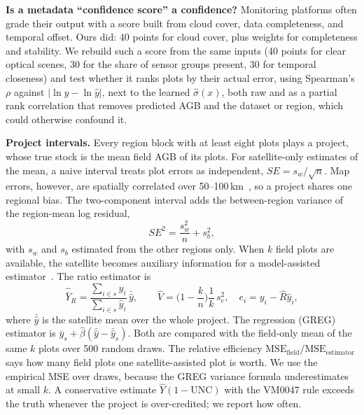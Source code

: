\documentclass[conference,a4paper]{IEEEtran}
\begin{document}
\textbf{Is a metadata ``confidence score'' a confidence?} Monitoring platforms often grade their output with a score built from cloud cover, data completeness, and temporal offset. Ours did: 40 points for cloud cover, plus weights for completeness and stability. We rebuild such a score from the same inputs (40 points for clear optical scenes, 30 for the share of sensor groups present, 30 for temporal closeness) and test whether it ranks plots by their actual error, using Spearman's $\rho$ against $|\ln y-\ln\hat y|$, next to the learned $\hat\sigma(x)$, both raw and as a partial rank correlation that removes predicted AGB and the dataset or region, which could otherwise confound it.

\textbf{Project intervals.} Every region block with at least eight plots plays a project, whose true stock is the mean field AGB of its plots. For satellite-only estimates of the mean, a naive interval treats plot errors as independent, $SE=s_w/\sqrt n$. Map errors, however, are spatially correlated over 50--100\,km~\cite{araza2022comprehensive}, so a project shares one regional bias. The two-component interval adds the between-region variance of the region-mean log residual,
\begin{equation}
SE^2=\frac{s_w^2}{n}+s_b^2,
\label{eq:twocomp}
\end{equation}
with $s_w$ and $s_b$ estimated from the other regions only. When $k$ field plots are available, the satellite becomes auxiliary information for a model-assisted estimator~\cite{cochran1977sampling,sarndal1992model}. The ratio estimator is
\begin{equation}
\hat{\bar Y}_R=\frac{\sum_{i\in s}y_i}{\sum_{i\in s}\hat y_i}\,\bar{\hat y},\qquad \widehat{V}=\Big(1-\frac kn\Big)\frac{1}{k}\,s_e^2,\quad e_i=y_i-\hat R\hat y_i,
\label{eq:ratio}
\end{equation}
where $\bar{\hat y}$ is the satellite mean over the whole project. The regression (GREG) estimator is $\bar y_s+\hat\beta(\bar{\hat y}-\bar{\hat y}_s)$. Both are compared with the field-only mean of the same $k$ plots over 500 random draws. The relative efficiency $\mathrm{MSE}_\text{field}/\mathrm{MSE}_\text{estimator}$ says how many field plots one satellite-assisted plot is worth. We use the empirical MSE over draws, because the GREG variance formula underestimates at small $k$. A conservative estimate $\hat Y(1-\mathrm{UNC})$ with the VM0047 rule exceeds the truth whenever the project is over-credited; we report how often.
\end{document}
